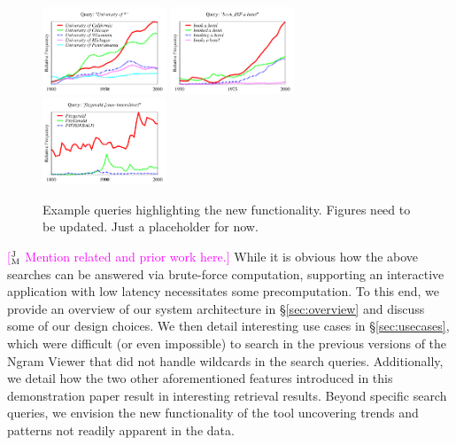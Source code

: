 \documentclass[11pt]{article}
\newcommand{\jmcomment}[1]{\textcolor{magenta}{[$^{\textsc{J}}_{\textsc{M}}$ #1]}}
\begin{document}
\begin{figure}
\centering
\hspace*{-0.5cm}
\includegraphics[width=0.33\textwidth]{graphs/university}
\hspace*{0.1cm}
\includegraphics[width=0.33\textwidth]{graphs/book}
\hspace*{0.1cm}
\includegraphics[width=0.33\textwidth]{graphs/fitzgerald}
\hspace*{-0.5cm}
\vspace*{-0.25cm}\caption{\label{fig:examples}
Example queries highlighting the new functionality. Figures need to be updated. Just a placeholder for now.}
\end{figure}

\jmcomment{Mention related and prior work here.} While it is obvious how the above searches can be answered via brute-force computation, supporting an interactive application with low latency necessitates some precomputation. To this end, we provide an overview of our system architecture in \S\ref{sec:overview} and discuss some of our design choices. We then detail interesting use cases in \S\ref{sec:usecases}, which were difficult (or even impossible) to search in the previous versions of the Ngram Viewer that did not handle wildcards in the search queries. Additionally, we detail how the two other aforementioned features introduced in this demonstration paper result in interesting retrieval results. Beyond specific search queries, we envision the new functionality of the tool uncovering trends and patterns not readily apparent in the data.
\end{document}
